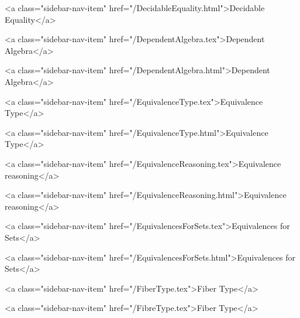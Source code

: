       
    
      
        
          <a class="sidebar-nav-item" href="/DecidableEquality.html">Decidable Equality</a>
        
      
    
      
        
          <a class="sidebar-nav-item" href="/DependentAlgebra.tex">Dependent Algebra</a>
        
      
    
      
        
          <a class="sidebar-nav-item" href="/DependentAlgebra.html">Dependent Algebra</a>
        
      
    
      
        
          <a class="sidebar-nav-item" href="/EquivalenceType.tex">Equivalence Type</a>
        
      
    
      
        
          <a class="sidebar-nav-item" href="/EquivalenceType.html">Equivalence Type</a>
        
      
    
      
        
          <a class="sidebar-nav-item" href="/EquivalenceReasoning.tex">Equivalence reasoning</a>
        
      
    
      
        
          <a class="sidebar-nav-item" href="/EquivalenceReasoning.html">Equivalence reasoning</a>
        
      
    
      
        
          <a class="sidebar-nav-item" href="/EquivalencesForSets.tex">Equivalences for Sets</a>
        
      
    
      
        
          <a class="sidebar-nav-item" href="/EquivalencesForSets.html">Equivalences for Sets</a>
        
      
    
      
        
          <a class="sidebar-nav-item" href="/FiberType.tex">Fiber Type</a>
        
      
    
      
        
          <a class="sidebar-nav-item" href="/FibreType.tex">Fiber Type</a>
        
